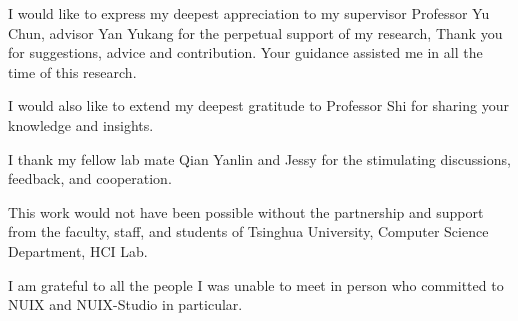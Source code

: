 \begin{acknowledgements}

  I would like to express my deepest appreciation to my supervisor Professor Yu Chun, advisor Yan Yukang for the perpetual support of my research, Thank you for suggestions, advice and contribution. Your guidance assisted me in all the time of this research.
  
  I would also like to extend my deepest gratitude to Professor Shi for sharing your knowledge and insights. 
  
  I thank my fellow lab mate Qian Yanlin and Jessy for the stimulating discussions, feedback, and cooperation.
  
  This work would not have been possible without the partnership and support from the faculty, staff, and students of Tsinghua University, Computer Science Department, HCI Lab. 
  
  I am grateful to all the people I was unable to meet in person who committed to NUIX and NUIX-Studio in particular.
  
\end{acknowledgements}

